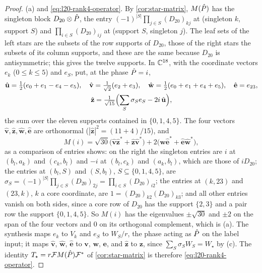 \begin{proof}
(a) and \eqref{eq:l20-rank4-operator}. By \cref{cor:star-matrix}, $M(\hat P)$ has
the singleton block $D_{20}\otimes\hat P$, the entry
$(-1)^{|S|}\prod_{j\in S}(D_{20})_{kj}$ at (singleton $k$, support $S$) and
$\prod_{i\in S}(D_{20})_{ij}$ at (support $S$, singleton $j$). The leaf sets of
the left stars are the subsets of the row supports of $D_{20}$, those of the
right stars the subsets of its column supports, and these are the same because
$D_{20}$ is antisymmetric; this gives the twelve supports. In $\mathbb C^{18}$, with
the coordinate vectors $e_k$ ($0\le k\le5$) and $e_S$, put, at the phase
$\hat P=i$,
\begin{gather*}
 \hat{\mathbf u}=\tfrac12(e_0+e_1-e_4-e_5),\quad
 \hat{\mathbf v}=\tfrac1{\sqrt2}(e_2+e_3),\quad
 \hat{\mathbf w}=\tfrac12(e_0+e_1+e_4+e_5),\quad
 \hat{\mathbf e}=e_{23},\\
 \hat{\mathbf z}=\tfrac1{\sqrt{15}}\Bigl(\sum_S\sigma_Se_S-2i\,\hat{\mathbf u}\Bigr),
\end{gather*}
the sum over the eleven supports contained in $\{0,1,4,5\}$. The four vectors
$\hat{\mathbf v},\hat{\mathbf z},\hat{\mathbf w},\hat{\mathbf e}$ are orthonormal
($|\hat{\mathbf z}|^2=(11+4)/15$), and
\[
 M(i)=\sqrt{30}\bigl(\hat{\mathbf v}\hat{\mathbf z}^*+\hat{\mathbf z}\hat{\mathbf v}^*\bigr)
 +2\bigl(\hat{\mathbf w}\hat{\mathbf e}^*+\hat{\mathbf e}\hat{\mathbf w}^*\bigr),
\]
as a comparison of entries shows: on the right the singleton entries are $i$ at
$(b_l,a_k)$ and $(c_k,b_l)$ and $-i$ at $(b_l,c_k)$ and $(a_k,b_l)$, which are
those of $iD_{20}$; the entries at $(b_l,S)$ and $(S,b_l)$, $S\subseteq
\{0,1,4,5\}$, are $\sigma_S=(-1)^{|S|}\prod_{j\in S}(D_{20})_{2j}
=\prod_{i\in S}(D_{20})_{i2}$; the entries at $(k,23)$ and $(23,k)$, $k$ a core
coordinate, are $1=(D_{20})_{k2}(D_{20})_{k3}$; and all other entries vanish on
both sides, since a core row of $D_{20}$ has the support $\{2,3\}$ and a pair row
the support $\{0,1,4,5\}$. So $M(i)$ has the eigenvalues $\pm\sqrt{30}$ and
$\pm2$ on the span of the four vectors and $0$ on its orthogonal complement,
which is (a). The synthesis maps $e_k$ to $V_k$ and $e_S$ to $W_S/r$, the phase
acting as $\hat P$ on the label input; it maps $\hat{\mathbf v}$,
$\hat{\mathbf w}$, $\hat{\mathbf e}$ to $\mathbf v$, $\mathbf w$, $\mathbf e$, and
$\hat{\mathbf z}$ to $\mathbf z$, since $\sum_S\sigma_SW_S=W_\star$ by (c). The
identity $T_\star=r\mathcal FM(\hat P)\mathcal F^*$ of \cref{cor:star-matrix} is
therefore \eqref{eq:l20-rank4-operator}.


\end{proof}
